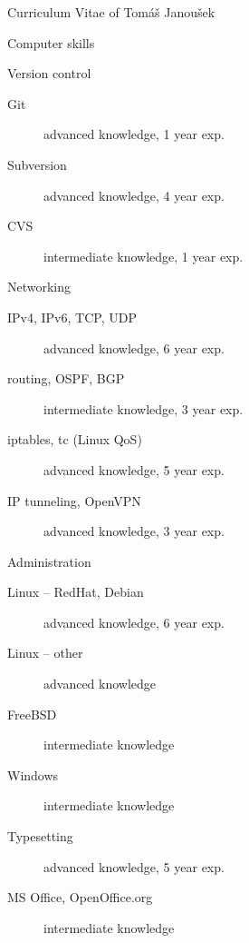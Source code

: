 \documentclass[12pt,a4paper,english,pdftex]{article}
\begin{document}
\begin{cv}{Curriculum Vitae of Tomáš Janoušek}
\begin{cvlist}{Computer skills}
	\goodbreak
        \item[Version control]
            \begin{description}
		\item[Git] advanced knowledge, 1 year exp.
                \item[Subversion] advanced knowledge, 4 year exp.
                \item[CVS] intermediate knowledge, 1 year exp.
            \end{description}

	\goodbreak
        \item[Networking]
            \begin{description}
                \item[IPv4, IPv6, TCP, UDP] advanced knowledge, 6 year exp.
                \item[routing, OSPF, BGP] intermediate knowledge, 3 year exp.
                \item[iptables, tc (Linux QoS)] advanced knowledge, 5 year
                exp.
                \item[IP tunneling, OpenVPN] advanced knowledge, 3 year exp.
            \end{description}

	\goodbreak
        \item[Administration]
            \begin{description}
                \item[Linux -- RedHat, Debian] advanced knowledge, 6 year exp.
                \item[Linux -- other] advanced knowledge
                \item[FreeBSD] intermediate knowledge %
                \item[Windows] intermediate knowledge
            \end{description}

	\goodbreak
        \item[Typesetting]
            \begin{description}
                \item[\LaTeXe] advanced knowledge, 5 year exp.
                \item[MS Office, OpenOffice.org] intermediate knowledge
            \end{description}


\end{cvlist}
\end{cv}
\end{document}
